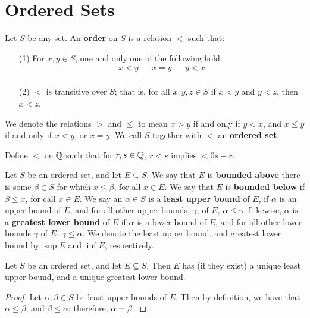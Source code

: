 \section{Ordered Sets}\label{section_1.1}

\begin{definition}
  Let $S$ be any set. An \textbf{order} on $S$ is a relation  $<$ such that:
  \begin{enumerate}
    \item[(1)] For $x,y \in S$, one and only one of the following hold:
      \begin{align*}
        x<y && x=y && y<x \\
      \end{align*}

    \item[(2)] $<$ is transitive over $S$; that is, for all $x,y,z \in S$ if
      $x<y$ and $y<z$, then $x<z$.
  \end{enumerate}
  We denote the relations $>$ and $\leq$ to mean $x>y$ if and only if $y<x$,
  and $x \leq y$ if and only if $x<y$, or $x=y$. We call $S$ together with  $<$
  an \textbf{ordered set}.
\end{definition}

\begin{example}
  Define $<$  on $\mathbb{Q}$ such that for $r,s \in \mathbb{Q}$, $r<s$ implies $<0s-r$.
\end{example}

\begin{definition}
  Let $S$ be an ordered set, and let  $E \subseteq S$. We say that  $E$ is
  \textbf{bounded above} there is some  $\beta \in S$ for which  $x \leq \beta$,
  for all $x \in E$. We say that $E$ is  \textbf{bounded below} if  $\beta \leq x$,
  for call  $x \in E$. We say an $\alpha \in S$ is a \textbf{least upper bound}
  of  $E$, if  $\alpha$ is an upper bound of  $E$, and for all other upper bounds,
  $\gamma$, of  $E$,  $\alpha \leq \gamma$. Likewise,  $\alpha$ is a \textbf{greatest
  lower bound}  of $E$ if  $\alpha$ is a lower bound of  $E$, and for all other
  lower bounds $\gamma$ of  $E$,  $\gamma \leq \alpha$. We denote the least upper
  bound, and greatest lower bound by  $\sup{E}$ and  $\inf{E}$, respectively.
\end{definition}

\begin{lemma}\label{theorem_1.1.1}
  Let $S$ be an ordered set, and let $E \subseteq S$. Then  $E$ has (if they
  exist) a unique least upper bound, and a unique greatest lower bound.
\end{lemma}
\begin{proof}
  Let $\alpha, \beta \in S$ be least upper bounds of $E$. Then by definition, we
  have that $\alpha \leq \beta$, and  $\beta \leq \alpha$; therefore, $\alpha=\beta$.
\end{proof}

